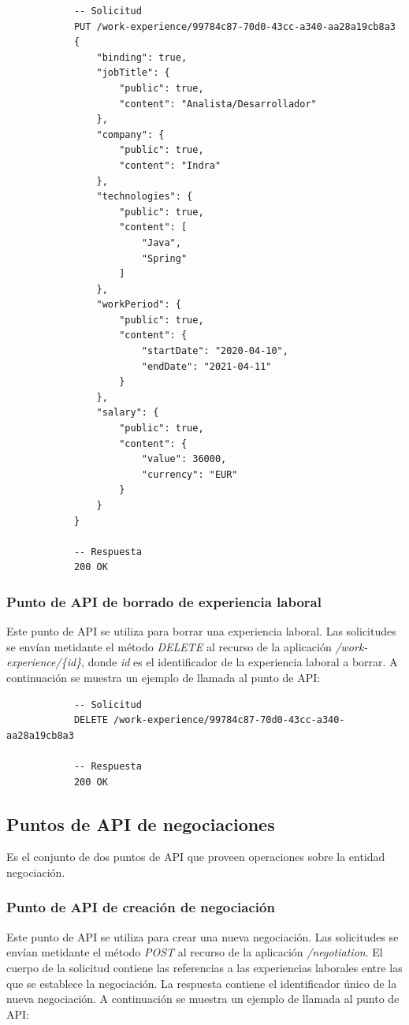 \documentclass[a4paper, 12pt]{book}
\begin{document}
        {\footnotesize
    \begin{verbatim}
			-- Solicitud
			PUT /work-experience/99784c87-70d0-43cc-a340-aa28a19cb8a3
			{
			    "binding": true,
			    "jobTitle": {
			        "public": true,
			        "content": "Analista/Desarrollador"
			    },
			    "company": {
			        "public": true,
			        "content": "Indra"
			    },
			    "technologies": {
			        "public": true,
			        "content": [
			            "Java",
			            "Spring"
			        ]
			    },
			    "workPeriod": {
			        "public": true,
			        "content": {
			            "startDate": "2020-04-10",
			            "endDate": "2021-04-11"
			        }
			    },
			    "salary": {
			        "public": true,
			        "content": {
			            "value": 36000,
			            "currency": "EUR"
			        }
			    }
			}

			-- Respuesta
			200 OK
    \end{verbatim}
    }

    \subsubsection{Punto de API de borrado de experiencia laboral}
    \label{subsec:delete_work_experience}
    Este punto de API se utiliza para borrar una experiencia laboral.
    Las solicitudes se envían metidante el método \emph{DELETE} al recurso de la aplicación \emph{/work-experience/\{id\}}, donde \emph{id} es el identificador de la experiencia laboral a borrar.
    A continuación se muestra un ejemplo de llamada al punto de API:

        {\footnotesize
    \begin{verbatim}
			-- Solicitud
			DELETE /work-experience/99784c87-70d0-43cc-a340-aa28a19cb8a3

			-- Respuesta
			200 OK
    \end{verbatim}
    }

    \subsection{Puntos de API de negociaciones}
    \label{subsec:negotiation_endpoints}
    Es el conjunto de dos puntos de API que proveen operaciones sobre la entidad negociación.

    \subsubsection{Punto de API de creación de negociación}
    \label{subsec:post_work_experience}
    Este punto de API se utiliza para crear una nueva negociación.
    Las solicitudes se envían metidante el método \emph{POST} al recurso de la aplicación \emph{/negotiation}.
    El cuerpo de la solicitud contiene las referencias a las experiencias laborales entre las que se establece la negociación.
    La respuesta contiene el identificador único de la nueva negociación.
    A continuación se muestra un ejemplo de llamada al punto de API:
\end{document}
